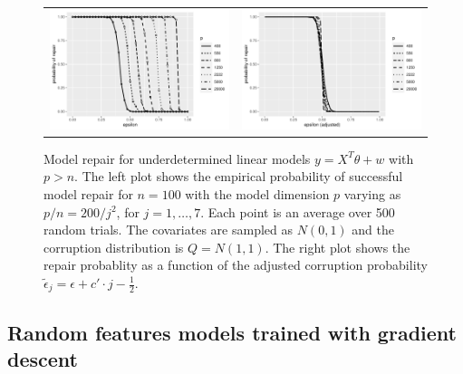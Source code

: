 \begin{figure}[t]
  \begin{center}
    \begin{tabular}{cc}
      \includegraphics[width=.47\textwidth]{fig/plot-linear-100} &
      \includegraphics[width=.47\textwidth]{fig/plot-linear-100-adj}\\[-10pt]
    \end{tabular}
  \end{center}
\caption{Model repair for underdetermined linear models $y=X^T\theta + w$ with $p>n$. The left plot shows the empirical probability of successful model repair for $n=100$ with the model dimension $p$
varying as $p/n = 200 /j^2$, for $j=1,\ldots, 7$. Each point is an average over 500 random trials. The covariates are sampled as $N(0,1)$ and the corruption distribution is $Q=N(1,1)$. The right plot shows the repair probablity as a function
of the adjusted corruption probability $\tilde\epsilon_j = \epsilon + c'\cdot j - \frac{1}{2}$.}
\label{fig:exp1}
\end{figure}


\subsection{Random features models trained with gradient descent}

